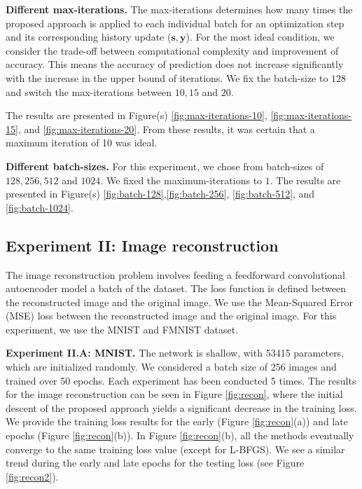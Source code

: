 \textbf{Different max-iterations.} The max-iterations determines how many times the proposed approach is applied to each individual batch for an optimization step and its corresponding history update ($\mathbf{s}, \mathbf{y}$). For the most ideal condition, we consider the trade-off between computational complexity and improvement of accuracy. This means the accuracy of prediction does not increase significantly with the increase in the upper bound of iterations. We fix the batch-size to $128$ and switch the max-iterations between $10, 15$ and $20$.

The results are presented in Figure(s) \ref{fig:max-iterations-10}, \ref{fig:max-iterations-15}, and \ref{fig:max-iterations-20}. From these results, it was certain that a maximum iteration of 10 was ideal. 

\textbf{Different batch-sizes.} For this experiment, we chose from batch-sizes of $128, 256, 512$ and $1024$. We fixed the maximum-iterations to $1$. The results are presented in Figure(s) \ref{fig:batch-128},\ref{fig:batch-256}, \ref{fig:batch-512}, and \ref{fig:batch-1024}.



\subsection{Experiment II: Image reconstruction}
The image reconstruction problem involves feeding a feedforward convolutional autoencoder model a batch of the dataset. The loss function is defined between the reconstructed image and the original image. We use the Mean-Squared Error (MSE) loss between the reconstructed image and the original image. For this experiment, we use the MNIST and FMNIST dataset.

\noindent \textbf{Experiment II.A: MNIST.} The network is shallow, with 53415 parameters, which are initialized randomly. We considered a batch size of 256 images and trained over 50 epochs. Each experiment has been conducted 5 times. The results for the image reconstruction can be seen in Figure \ref{fig:recon}, where the initial descent of the proposed approach yields a significant decrease in the training loss. We provide the training loss results for the early (Figure  \ref{fig:recon}(a)) and late epochs (Figure \ref{fig:recon}(b)).
In Figure \ref{fig:recon}(b), all the methods eventually converge to the same training loss value (except for L-BFGS).  We 
see a similar trend during the early and late epochs for the testing loss (see Figure \ref{fig:recon2}).

